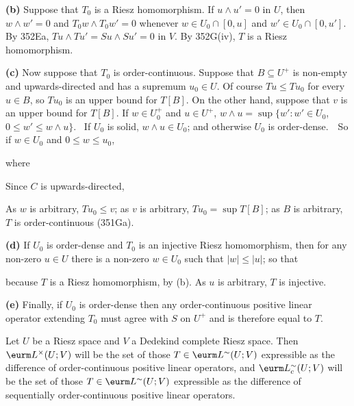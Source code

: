 {\medskip

{\bf (b)} Suppose that $T_0$ is a Riesz homomorphism.   If $u\wedge u'=0$
in $U$, then $w\wedge w'=0$ and $T_0w\wedge T_0w'=0$ whenever
$w\in U_0\cap[0,u]$ and $w'\in U_0\cap[0,u']$.   By 352Ea,
$Tu\wedge Tu'=Su\wedge Su'=0$ in $V$.   By 352G(iv), $T$ is a Riesz
homomorphism.

\medskip

{\bf (c)} Now suppose that $T_0$ is order-continuous.
Suppose that $B\subseteq U^+$ is non-empty and upwards-directed and has a
supremum $u_0\in U$.   Of course $Tu\le Tu_0$ for every $u\in B$, so $Tu_0$
is an upper bound for $T[B]$.   On the other hand, suppose that
$v$ is an upper bound for $T[B]$.   If $w\in U^+_0$ and
$u\in U^+$, $w\wedge u=\sup\{w':w'\in U_0$, $0\le w'\le w\wedge u\}$.
\Prf\ If $U_0$ is solid, $w\wedge u\in U_0$;  and otherwise $U_0$ is
order-dense.\ \QeD\  So if $w\in U_0$ and $0\le w\le u_0$,


\noindent where


\noindent Since $C$ is upwards-directed,


\noindent As $w$ is arbitrary, $Tu_0\le v$;  as $v$ is arbitrary,
$Tu_0=\sup T[B]$;  as $B$ is arbitrary, $T$ is order-continuous (351Ga).

\medskip

{\bf (d)} If $U_0$ is order-dense and $T_0$ is an injective
Riesz homomorphism, then for any non-zero $u\in U$ there is a non-zero
$w\in U_0$ such that $|w|\le|u|$;  so that


\noindent because $T$ is a Riesz homomorphism, by (b).   As $u$ is
arbitrary, $T$ is injective.

\medskip

{\bf (e)} Finally, if $U_0$ is order-dense then any order-continuous
positive linear operator extending $T_0$ must agree with $S$ on $U^+$ and
is therefore equal to $T$.
}%

 Let $U$ be a Riesz space and $V$ a Dedekind
complete Riesz space.   Then $\eurm L^{\times}(U;V)$ will be the set of
those $T\in\eurm L^{\sim}(U;V)$ expressible as the difference of
order-continuous positive linear operators, and $\eurm L^{\sim}_c(U;V)$
will be the set of those $T\in\eurm L^{\sim}(U;V)$ expressible as the
difference of sequentially order-continuous positive linear operators.


